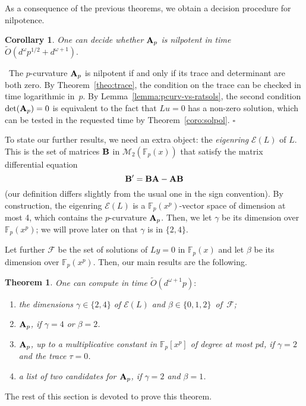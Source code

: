 \documentclass{sig-alternate}
\newcommand{\bigOsoft}{\tilde{O}}
\def\F {\mathbb{F}}
\def\mA {\ensuremath{{\bf A}}}
\def\mB {\ensuremath{{\bf B}}}
\def\myproof{\noindent{\sc Proof.}~}
\def\foorp{\hfill$\square$}
\newtheorem{theorem}{Theorem}
\newtheorem{Coro}{Corollary}
\begin{document}
\smallskip{} As a consequence of the
previous theorems, we obtain a decision procedure for nilpotence.
\begin{Coro}\label{coro:nilpotence}
  One can decide whether $\mA_p$ is nilpotent in time
  $\bigOsoft(d^\omega p^{1/2}+ d^{\omega+1}).$
\end{Coro} 
\myproof The $p$-curvature $\mA_p$ is nilpotent if and only if its
trace and determinant are both zero. By Theorem~\ref{theo:trace}, the
condition on the trace can be checked in time logarithmic in~$p$. By
Lemma~\ref{lemma:pcurv-vs-ratsols}, the second condition
$\det(\mA_p)=0$ is equivalent to the fact that $Lu=0$ has a non-zero
solution, which can be tested in the requested time by
Theorem~\ref{coro:solpol}.  \foorp

\smallskip{} To state our further results,
we need an extra object: the {\em eigenring} $\mathcal{E}(L)$ of
$L$. This is the set of matrices $\mB$ in $\mathscr{M}_2(\F_p(x))$
that satisfy the matrix differential equation
\begin{equation}
  \label{eq:eigenring}
  \mB' =  \mB \mA - \mA \mB
\end{equation}
(our definition differs slightly from the usual one in the sign
convention). By construction, the eigenring $\mathcal{E}(L)$ is a
$\F_p(x^p)$-vector space of dimension at most 4, which contains the
$p$-curvature $\mA_p$. Then, we let $\gamma$ be its dimension over
$\F_p(x^p)$; we will prove later on that $\gamma$ is in $\{2,4\}$.

Let further $\mathcal{F}$ be the set of solutions of $Ly=0$ in
$\F_p(x)$ and let $\beta$ be its dimension over $\F_p(x^p)$.  Then,
our main results are the following.
\begin{theorem}\label{theo:main2}
  One can compute in time $\bigOsoft(d^{\omega+1}p):$
  \begin{enumerate}
  \item[1.] the dimensions $\gamma \!\in\! \{2,4 \}$ of $\mathcal{E}(L)$
    and $\beta \!\in\! \{0,1,2 \}$~of~$\mathcal{F}$;
  \item[2.] $\mA_p$, if $\gamma=4$ or $\beta=2$.
  \item[3.] $\mA_p$, up to a multiplicative constant in $\F_p[x^p]$ of
    degree at most $pd$, if $\gamma=2$ and the trace $\tau=0$.
  \item[4.] a list of two candidates for $\mA_p$, if $\gamma=2$ and
    $\beta=1$.
\end{enumerate}        
\end{theorem}
\noindent The rest of this section is devoted to prove this theorem.
\end{document}
